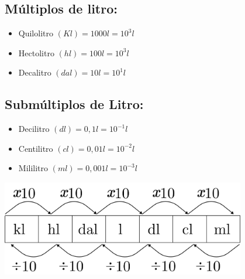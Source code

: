 \begin{multicols}{2}
	\subsection{Múltiplos de litro:}
		\begin{itemize}
		    \item Quilolitro $(Kl) = 1000 l = 10^3 l$
		    \item Hectolitro $(hl) = 100 l = 10^3 l$
		    \item Decalitro $(dal) = 10 l = 10^1l$
		\end{itemize}
	
	\subsection{Submúltiplos de Litro:}
		\begin{itemize}
		    \item Decilitro $(dl) = 0,1 l = 10^{-1}l$
		    \item Centilitro $(cl) = 0,01 l = 10^{-2}l$
		    \item Mililitro $(ml) = 0,001 l = 10^{-3}l$
		\end{itemize}
    
    \columnbreak
     \bigskip
     \noindent   
     \begin{minipage}{\linewidth}
    \centering 
    \includegraphics[width=0.8\textwidth]{imagens/matematicaBasica/sistemaDeUnidades/MultiplosDeLitro.pdf}
     \end{minipage}
   \end{multicols}  
